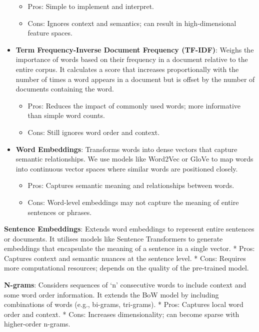 \documentclass[
  letterpaper,
  DIV=11,
  numbers=noendperiod]{scrreprt}
\providecommand{\tightlist}{%
  \setlength{\itemsep}{0pt}\setlength{\parskip}{0pt}}\usepackage{longtable,booktabs,array}
\begin{document}
\begin{tcolorbox}
\begin{itemize}
  \begin{itemize}
  \tightlist
  \item
    Pros: Simple to implement and interpret.
  \item
    Cons: Ignores context and semantics; can result in high-dimensional
    feature spaces.
  \end{itemize}
\item
  \textbf{Term Frequency-Inverse Document Frequency (TF-IDF)}: Weighs
  the importance of words based on their frequency in a document
  relative to the entire corpus. It calculates a score that increases
  proportionally with the number of times a word appears in a document
  but is offset by the number of documents containing the word.

  \begin{itemize}
  \tightlist
  \item
    Pros: Reduces the impact of commonly used words; more informative
    than simple word counts.
  \item
    Cons: Still ignores word order and context.
  \end{itemize}
\item
  \textbf{Word Embeddings}: Transforms words into dense vectors that
  capture semantic relationships. We use models like Word2Vec or GloVe
  to map words into continuous vector spaces where similar words are
  positioned closely.

  \begin{itemize}
  \tightlist
  \item
    Pros: Captures semantic meaning and relationships between words.
  \item
    Cons: Word-level embeddings may not capture the meaning of entire
    sentences or phrases.
  \end{itemize}
\end{itemize}

\textbf{Sentence Embeddings}: Extends word embeddings to represent
entire sentences or documents. It utilises models like Sentence
Transformers to generate embeddings that encapsulate the meaning of a
sentence in a single vector. * Pros: Captures context and semantic
nuances at the sentence level. * Cons: Requires more computational
resources; depends on the quality of the pre-trained model.

\textbf{N-grams}: Considers sequences of `n' consecutive words to
include context and some word order information. It extends the BoW
model by including combinations of words (e.g., bi-grams, tri-grams). *
Pros: Captures local word order and context. * Cons: Increases
dimensionality; can become sparse with higher-order n-grams.


\end{tcolorbox}
\end{document}
